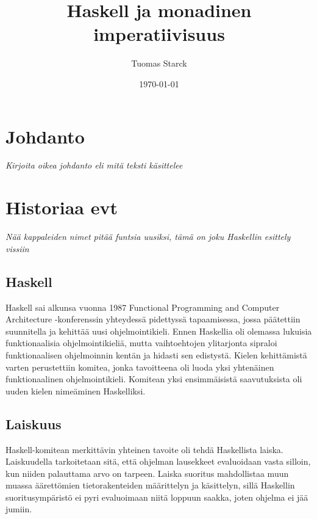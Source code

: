 \documentclass[finnish]{tktltiki2}
\title{Haskell ja monadinen imperatiivisuus}
\author{Tuomas Starck}
\date{\today}
\begin{document}
\frontmatter

\maketitle
\makeabstract

\tableofcontents

\mainmatter

\newcommand{\arr}[0]{\rightarrow}
\newcommand{\code}[1]{\texttt{#1}}
\newcommand{\fixme}[1]{\emph{#1}}


\section{Johdanto}


\fixme{Kirjoita oikea johdanto eli mitä teksti käsittelee}


\section{Historiaa evt}

\fixme{Nää kappaleiden nimet pitää funtsia uusiksi, tämä on joku Haskellin esittely vissiin}

\subsection{Haskell}

Haskell sai alkunsa vuonna 1987 Functional Programming and Computer Architecture -konferenssin
yhteydessä pidettyssä tapaamisessa, jossa päätettiin suunnitella ja kehittää uusi ohjelmointikieli.
Ennen Haskellia oli olemassa lukuisia funktionaalisia ohjelmointikieliä, mutta vaihtoehtojen
ylitarjonta sipraloi funktionaalisen ohjelmoinnin kentän ja hidasti sen edistystä. Kielen
kehittämistä varten perustettiin komitea, jonka tavoitteena oli luoda yksi yhtenäinen
funktionaalinen ohjelmointikieli. Komitean yksi ensimmäisistä saavutuksista oli uuden kielen
nimeäminen Haskelliksi.

\subsection{Laiskuus}
\label{subsec:laiskuus}

Haskell-komitean merkittävin yhteinen tavoite oli tehdä Haskellista laiska. Laiskuudella
tarkoitetaan sitä, että ohjelman lausekkeet evaluoidaan vasta silloin, kun niiden palauttama arvo on
tarpeen. Laiska suoritus mahdollistaa muun muassa äärettömien tietorakenteiden määrittelyn ja
käsittelyn, sillä Haskellin suoritusympäristö ei pyri evaluoimaan niitä loppuun saakka, joten
ohjelma ei jää jumiin.
\end{document}
